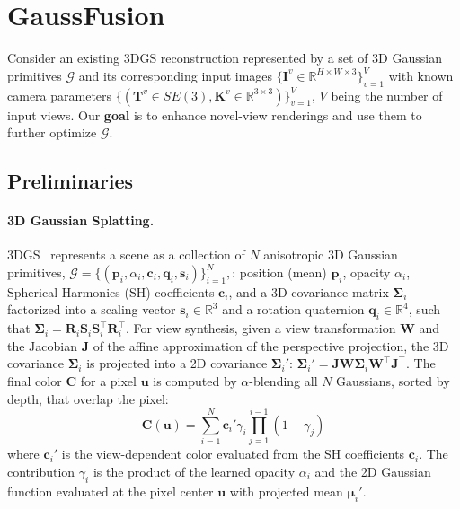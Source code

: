 \section{GaussFusion}
Consider an existing 3DGS reconstruction represented by a set of 3D Gaussian primitives $\mathcal{G}$ and its corresponding input images $\{\mathbf{I}^v\in \mathbb{R}^{H \times W \times 3}\}_{v=1}^{V}$ with known camera parameters $\{(\mathbf{T}^v\in SE(3), \mathbf{K}^v\in \mathbb{R}^{3\times3})\}_{v=1}^{V}$, $V$ being the number of input views. Our \textbf{goal} is to enhance novel-view renderings and use them to further optimize $\mathcal{G}$. 

\subsection{Preliminaries}
\paragraph{3D Gaussian Splatting.}
3DGS~\cite{kerbl3Dgaussians} represents a scene as a collection of $N$ anisotropic 3D Gaussian primitives, $
\mathcal{G} = \{(\mathbf{p}_i, \alpha_i, \mathbf{c}_i, \mathbf{q}_i, \mathbf{s}_i) \}_{i=1}^{N},
$: position (mean) $\mathbf{p}_i$, opacity $\alpha_i$, Spherical Harmonics (SH) coefficients $\mathbf{c}_i$, and a 3D covariance matrix $\mathbf{\Sigma}_i$ factorized into a scaling vector $\mathbf{s}_i \in \mathbb{R}^3$ and a rotation quaternion $\mathbf{q}_i \in \mathbb{R}^4$, such that $\mathbf{\Sigma}_i = \mathbf{R}_i \mathbf{S}_i \mathbf{S}_i^\top \mathbf{R}_i^\top$. For view synthesis, given a view transformation $\mathbf{W}$ and the Jacobian $\mathbf{J}$ of the affine approximation of the perspective projection, the 3D covariance $\mathbf{\Sigma}_i$ is projected into a 2D covariance $\mathbf{\Sigma}_i'$:
    $\mathbf{\Sigma}_i' = \mathbf{J} \mathbf{W} \mathbf{\Sigma}_i \mathbf{W}^\top \mathbf{J}^\top$.
The final color $\mathbf{C}$ for a pixel $\mathbf{u}$ is computed by $\alpha$-blending all $N$ Gaussians, sorted by depth, that overlap the pixel:
\begin{equation}
    \mathbf{C}(\mathbf{u}) = \sum_{i=1}^{N} \mathbf{c}_i' \gamma_i \prod_{j=1}^{i-1} (1 - \gamma_j)
    \label{eq:alphablending}
\end{equation}
where $\mathbf{c}_i'$ is the view-dependent color evaluated from the SH coefficients $\mathbf{c}_i$. The contribution $\gamma_i$ is the product of the learned opacity $\alpha_i$ and the 2D Gaussian function evaluated at the pixel center $\mathbf{u}$ with projected mean $\mathbf{\mu}_i'$.

